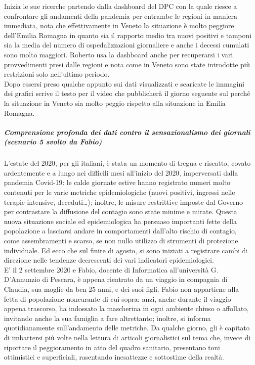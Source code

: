 Inizia le sue ricerche partendo dalla dashboard del DPC con la quale riesce a confrontare gli andamenti della pandemia per entrambe le regioni in maniera immediata, nota che effettivamente in Veneto la situazione è molto peggiore dell'Emilia Romagna in quanto sia il rapporto medio tra nuovi positivi e tamponi sia la media del numero di ospedalizzazioni giornaliere e anche i decessi cumulati sono  molto maggiori.
Roberto usa la dashboard anche per recuperarsi i vari provvedimenti presi dalle regioni e nota come in Veneto sono state introdotte più restrizioni solo nell'ultimo periodo. \\
Dopo essersi preso qualche appunto sui dati visualizzati e scaricate le immagini dei grafici scrive il testo per il video che pubblicherà il giorno seguente sul perché la situazione in Veneto sia molto peggio rispetto alla situazione in Emilia Romagna.
\noindent
\subparagraph{Comprensione profonda dei dati contro il sensazionalismo dei giornali (scenario 5 svolto da Fabio)}
L'estate del 2020, per gli italiani, è stata un momento di tregua e riscatto, covato ardentemente e a lungo nei difficili mesi all'inizio del 2020, imperversati dalla pandemia Covid-19: le calde giornate estive hanno registrato numeri molto contenuti per le varie metriche epidemiologiche (nuovi positivi, ingressi nelle terapie intensive, deceduti…); inoltre, le misure restrittive imposte dal Governo per contrastare la diffusione del contagio sono state minime e mirate.
Questa nuova situazione sociale ed epidemiologica ha persuaso importanti fette della popolazione a lasciarsi andare in comportamenti dall'alto rischio di contagio, come assembramenti e scarso, se non nullo utilizzo di strumenti di protezione individuale.
Ed ecco che sul finire di agosto, si sono iniziati a registrare cambi di direzione nelle tendenze decrescenti dei vari indicatori epidemiologici.\\
E' il 2 settembre 2020 e Fabio, docente di Informatica all'università G. D'Annunzio di Pescara, è appena rientrato da un viaggio in compagnia di Claudia, sua moglie da ben 25 anni, e dei suoi figli.
Fabio non appartiene alla fetta di popolazione noncurante di cui sopra: anzi, anche durante il viaggio appena trascorso, ha indossato la mascherina in ogni ambiente chiuso o affollato, invitando anche la sua famiglia a fare altrettanto; inoltre, si informa quotidianamente sull'andamento delle metriche.
Da qualche giorno, gli è capitato di imbattersi più volte nella lettura di articoli giornalistici sul tema che, invece di riportare il peggioramento in atto del quadro sanitario, presentano toni ottimistici e superficiali, rasentando inesattezze e sottostime della realtà.
